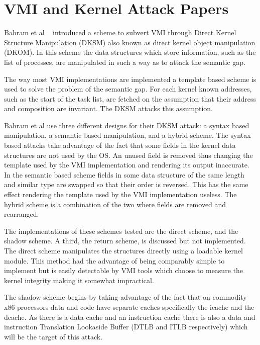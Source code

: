 \section{VMI and Kernel Attack Papers}

Bahram et al ~\cite{bahram_dksm:_2010} introduced a scheme to subvert VMI through Direct Kernel Structure Manipulation (DKSM) also known as direct kernel object manipulation (DKOM). In this scheme the data structures which store information, such as the list of processes, are manipulated in such a way as to attack the semantic gap. 

The way most VMI implementations are implemented a template based scheme is used to solve the problem of the semantic gap. For each kernel known addresses, such as the start of the task list, are fetched on the assumption that their address and composition are invariant. The DKSM attacks this assumption. 

Bahram et al use three different designs for their DKSM attack: a syntax based manipulation, a semantic based manipulation, and a hybrid scheme. The syntax based attacks take advantage of the fact that some fields in the kernel data structures are not used by the OS. An unused field is removed thus changing the template used by the VMI implementation and rendering its output inaccurate.  In the semantic based scheme fields in some data structure of the same length and similar type are swapped so that their order is reversed. This has the same effect rendering the template used by the VMI implementation useless. The hybrid scheme is a combination of the two where fields are removed and rearranged. 

The implementations of these schemes tested are the direct scheme, and the shadow scheme. A third, the return scheme, is discussed but not implemented. The direct scheme manipulates the structures directly using a loadable kernel module. This method had the advantage of being comparably simple to implement but is easily detectable by VMI tools which choose to measure the kernel integrity making it somewhat impractical. 

The shadow scheme begins by taking advantage of the fact that on commodity x86 processors data and code have separate caches specifically the icache and the dcache. As there is a data cache and an instruction cache there is also a data and instruction Translation Lookaside Buffer (DTLB and ITLB respectively) which will be the target of this attack. 


